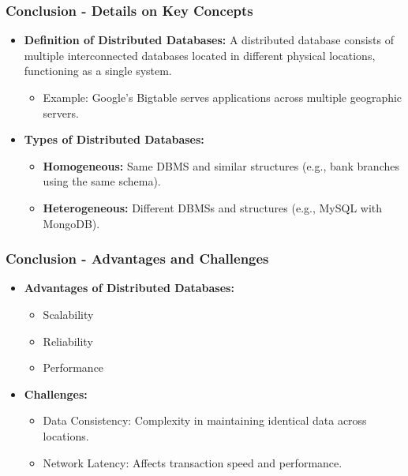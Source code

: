 \documentclass[aspectratio=169]{beamer}
\begin{document}
\begin{frame}[fragile]
  \frametitle{Conclusion - Details on Key Concepts}

  \begin{itemize}
    \item \textbf{Definition of Distributed Databases:} 
    A distributed database consists of multiple interconnected databases located in different physical locations, functioning as a single system. 
    \begin{itemize}
      \item Example: Google’s Bigtable serves applications across multiple geographic servers.
    \end{itemize}
    
    \item \textbf{Types of Distributed Databases:}
    \begin{itemize}
      \item \textbf{Homogeneous:} Same DBMS and similar structures (e.g., bank branches using the same schema).
      \item \textbf{Heterogeneous:} Different DBMSs and structures (e.g., MySQL with MongoDB).
    \end{itemize}
  \end{itemize}
\end{frame}

\begin{frame}[fragile]
  \frametitle{Conclusion - Advantages and Challenges}

  \begin{itemize}
    \item \textbf{Advantages of Distributed Databases:}
    \begin{itemize}
      \item Scalability
      \item Reliability
      \item Performance
    \end{itemize}

    \item \textbf{Challenges:}
    \begin{itemize}
      \item Data Consistency: Complexity in maintaining identical data across locations.
      \item Network Latency: Affects transaction speed and performance.
    \end{itemize}
  \end{itemize}
\end{frame}
\end{document}
